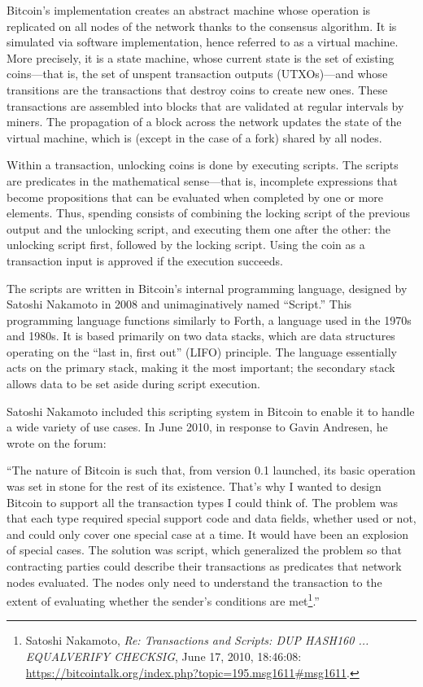 \documentclass[
  a5paper,
  smalldemyvopaper,10pt,twoside,onecolumn,openright,extrafontsizes,hidelinks]{memoir}
\begin{document}
Bitcoin's implementation creates an abstract machine whose operation is
replicated on all nodes of the network thanks to the consensus
algorithm. It is simulated via software implementation, hence referred
to as a virtual machine. More precisely, it is a state machine, whose
current state is the set of existing coins---that is, the set of unspent
transaction outputs (UTXOs)---and whose transitions are the transactions
that destroy coins to create new ones. These transactions are assembled
into blocks that are validated at regular intervals by miners. The
propagation of a block across the network updates the state of the
virtual machine, which is (except in the case of a fork) shared by all
nodes.

Within a transaction, unlocking coins is done by executing scripts. The
scripts are predicates in the mathematical sense---that is, incomplete
expressions that become propositions that can be evaluated when
completed by one or more elements. Thus, spending consists of combining
the locking script of the previous output and the unlocking script, and
executing them one after the other: the unlocking script first, followed
by the locking script. Using the coin as a transaction input is approved
if the execution succeeds.

The scripts are written in Bitcoin's internal programming language,
designed by Satoshi Nakamoto in 2008 and unimaginatively named
``Script.'' This programming language functions similarly to Forth, a
language used in the 1970s and 1980s. It is based primarily on two data
stacks, which are data structures operating on the ``last in, first
out'' (LIFO) principle. The language essentially acts on the primary
stack, making it the most important; the secondary stack allows data to
be set aside during script execution.

Satoshi Nakamoto included this scripting system in Bitcoin to enable it
to handle a wide variety of use cases. In June 2010, in response to
Gavin Andresen, he wrote on the forum:

``The nature of Bitcoin is such that, from version 0.1 launched, its
basic operation was set in stone for the rest of its existence. That's
why I wanted to design Bitcoin to support all the transaction types I
could think of. The problem was that each type required special support
code and data fields, whether used or not, and could only cover one
special case at a time. It would have been an explosion of special
cases. The solution was script, which generalized the problem so that
contracting parties could describe their transactions as predicates that
network nodes evaluated. The nodes only need to understand the
transaction to the extent of evaluating whether the sender's conditions
are met\footnote{Satoshi Nakamoto, \emph{Re: Transactions and Scripts:
  DUP HASH160 ... EQUALVERIFY CHECKSIG}, June 17, 2010, 18:46:08:
  \url{https://bitcointalk.org/index.php?topic=195.msg1611\#msg1611}.}.''
\end{document}
